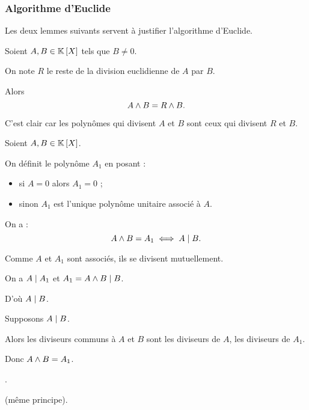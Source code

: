 \subsubsection{Algorithme d'Euclide}

Les deux lemmes suivants servent à justifier l'algorithme d'Euclide.

\begin{lem}
Soient \(A,B\in\poly\) tels que \(B\not=0\).

On note \(R\) le reste de la division euclidienne de \(A\) par \(B\).

Alors \[A\land B=R\land B.\]
\end{lem}

\begin{dem}
C'est clair car les polynômes qui divisent \(A\) et \(B\) sont ceux qui divisent \(R\) et \(B\).
\end{dem}

\begin{lem}
Soient \(A,B\in\poly\).

On définit le polynôme \(A_1\) en posant : \begin{itemize}
\item si \(A=0\) alors \(A_1=0\) ;

\item sinon \(A_1\) est l'unique polynôme unitaire associé à \(A\). \\
\end{itemize}

On a : \[A\land B=A_1\iff A\mid B.\]
\end{lem}

\begin{dem}
\impdir

Comme \(A\) et \(A_1\) sont associés, ils se divisent mutuellement.

On a \(A\mid A_1\) et \(A_1=A\land B\mid B\).

D'où \(A\mid B\).

\imprec

Supposons \(A\mid B\).

Alors les diviseurs communs à \(A\) et \(B\) sont les diviseurs de \(A\), \cad les diviseurs de \(A_1\).

Donc \(A\land B=A_1\).
\end{dem}

\begin{algo}
\Cf {}.
\end{algo}

\begin{algo}
\Cf {} (même principe).
\end{algo}


